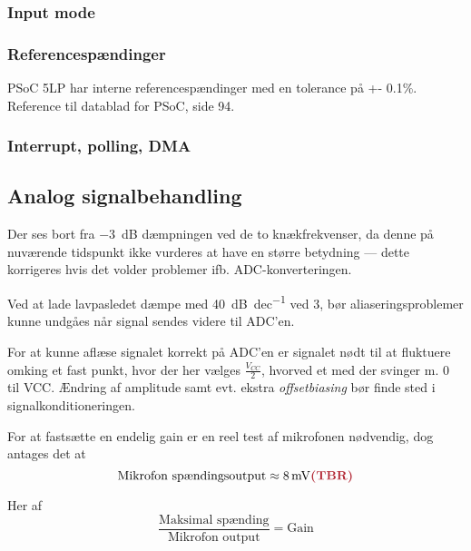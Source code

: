\subsubsection{Input mode}
\subsubsection{Referencespændinger}
PSoC 5LP har interne referencespændinger med en tolerance på +- 0.1\%. \tbr Reference til datablad for PSoC, side 94.



\subsubsection{Interrupt, polling, DMA}

\subsection{Analog signalbehandling}




Der ses bort fra \SI{-3}{\dB} dæmpningen ved de to knækfrekvenser, da denne på nuværende tidspunkt ikke vurderes at have en større betydning --- dette korrigeres hvis det volder problemer ifb. ADC-konverteringen.

Ved at lade lavpasledet dæmpe med \SI{40}{\dB\per dec} ved 3\kHz, bør aliaseringsproblemer kunne undgåes når signal sendes videre til ADC'en.

For at kunne aflæse signalet korrekt på ADC'en er signalet nødt til at fluktuere omking et fast punkt, hvor der her vælges \(\frac{V_{CC}}{2}\), hvorved et med der svinger m. 0 til VCC. 
Ændring af amplitude samt evt. ekstra \emph{offsetbiasing} bør finde sted i signalkonditioneringen.

For at fastsætte en endelig gain er en reel test af mikrofonen nødvendig, dog antages det at 
\begin{equation}
    \textrm{Mikrofon spændingsoutput}\approx \SI{8}{mV} \tbr
\end{equation}

Her af
\begin{equation}
    \frac{\textrm{Maksimal spænding}}{\textrm{Mikrofon output}} = \textrm{Gain}
\end{equation} 

